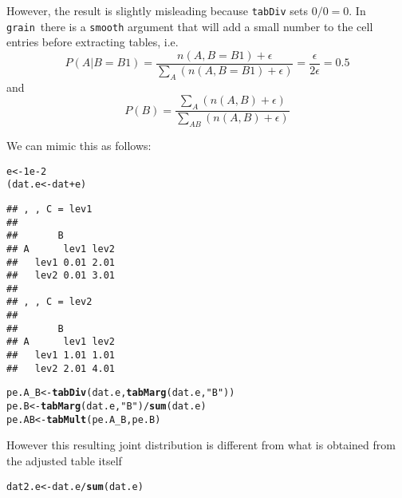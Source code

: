 \documentclass[10pt]{article}\usepackage[]{graphicx}\usepackage[]{xcolor}
\makeatletter
\newcommand{\hlnum}[1]{\textcolor[rgb]{0.686,0.059,0.569}{#1}}%
\newcommand{\hlstr}[1]{\textcolor[rgb]{0.192,0.494,0.8}{#1}}%
\newcommand{\hlopt}[1]{\textcolor[rgb]{0,0,0}{#1}}%
\newcommand{\hlstd}[1]{\textcolor[rgb]{0.345,0.345,0.345}{#1}}%
\newcommand{\hlkwb}[1]{\textcolor[rgb]{0.69,0.353,0.396}{#1}}%
\newcommand{\hlkwd}[1]{\textcolor[rgb]{0.737,0.353,0.396}{\textbf{#1}}}%
\newenvironment{kframe}{%
 \def\at@end@of@kframe{}%
 \ifinner\ifhmode%
  \def\at@end@of@kframe{\end{minipage}}%
  \begin{minipage}{\columnwidth}%
 \fi\fi%
 \def\FrameCommand##1{\hskip\@totalleftmargin \hskip-\fboxsep
 \colorbox{shadecolor}{##1}\hskip-\fboxsep
     \hskip-\linewidth \hskip-\@totalleftmargin \hskip\columnwidth}%
 \MakeFramed {\advance\hsize-\width
   \@totalleftmargin\z@ \linewidth\hsize
   \@setminipage}}%
 {\par\unskip\endMakeFramed%
 \at@end@of@kframe}
\newenvironment{knitrout}{}{} %
\def\grain{\texttt{grain}}
\def\code#1{{\texttt{#1}}}
\makeatother
\begin{document}
However, the result is slightly misleading because \code{tabDiv}
sets $0/0=0$.
In \grain\ there is a \code{smooth} argument that will add a small
number to the cell entries before extracting tables, i.e.
\begin{displaymath}
  P(A|B=B1)=\frac{n(A,B=B1)+\epsilon}{\sum_A ( n(A,B=B1) + \epsilon) }
  = \frac{\epsilon}{2\epsilon} = 0.5
\end{displaymath}
and
\begin{displaymath}
  P(B)= \frac{\sum_A (n(A,B)+\epsilon)}{\sum_{AB} (n(A,B)+\epsilon)}
\end{displaymath}

We can mimic this as follows:
\begin{knitrout}
\color{fgcolor}\begin{kframe}
\begin{alltt}
\hlstd{e} \hlkwb{<-} \hlnum{1e-2}
\hlstd{(dat.e} \hlkwb{<-} \hlstd{dat} \hlopt{+} \hlstd{e)}
\end{alltt}
\begin{verbatim}
## , , C = lev1
## 
##       B
## A      lev1 lev2
##   lev1 0.01 2.01
##   lev2 0.01 3.01
## 
## , , C = lev2
## 
##       B
## A      lev1 lev2
##   lev1 1.01 1.01
##   lev2 2.01 4.01
\end{verbatim}
\end{kframe}
\end{knitrout}

\begin{knitrout}
\color{fgcolor}\begin{kframe}
\begin{alltt}
\hlstd{pe.A_B} \hlkwb{<-} \hlkwd{tabDiv}\hlstd{(dat.e,} \hlkwd{tabMarg}\hlstd{(dat.e,} \hlstr{"B"}\hlstd{))}
\hlstd{pe.B}   \hlkwb{<-} \hlkwd{tabMarg}\hlstd{(dat.e,} \hlstr{"B"}\hlstd{)} \hlopt{/} \hlkwd{sum}\hlstd{(dat.e)}
\hlstd{pe.AB}  \hlkwb{<-} \hlkwd{tabMult}\hlstd{(pe.A_B, pe.B)}
\end{alltt}
\end{kframe}
\end{knitrout}

However this resulting joint distribution is different from what is
obtained from the adjusted table itself
\begin{knitrout}
\color{fgcolor}\begin{kframe}
\begin{alltt}
\hlstd{dat2.e} \hlkwb{<-} \hlstd{dat.e} \hlopt{/} \hlkwd{sum}\hlstd{(dat.e)}
\end{alltt}
\end{kframe}
\end{knitrout}
\end{document}
